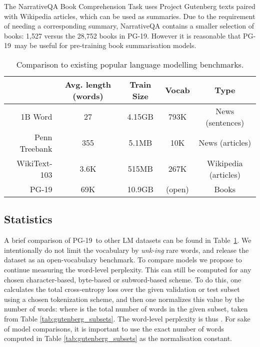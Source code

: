 \documentclass{article} \usepackage{iclr2020_conference,times}
\newcommand{\dataset}{PG-19}
\begin{document}
The NarrativeQA Book Comprehension Task \citep{kovcisky2018narrativeqa} uses Project Gutenberg texts paired with Wikipedia articles, which can be used as summaries. Due to the requirement of needing a corresponding summary, NarrativeQA contains a smaller selection of books: 1,527 versus the 28,752 books in \dataset. However it is reasonable that \dataset~may be useful for pre-training book summarisation models.
\begin{table}[]
    \footnotesize
    \centering
    \caption{Comparison to existing popular language modelling benchmarks.}
    \label{tab:compare_datasets}
    \begin{tabular}{rc c c c}
    \toprule
    & \textbf{Avg. length (words)} & \textbf{Train Size} & \textbf{Vocab} & \textbf{Type} \\
    \midrule
    1B Word &   27      & 4.15GB      & 793K & News (sentences) \\
    Penn Treebank           & 355       & 5.1MB   &  10K  & News (articles) \\
    WikiText-103            & 3.6K      & 515MB      & 267K & Wikipedia (articles) \\
    \midrule
    \dataset       & 69K       & 10.9GB     & (open) & Books \\
    \bottomrule
    \end{tabular}
\end{table}
\vspace{-1em}
\subsection{Statistics}
\label{sec:stats}
A brief comparison of \dataset~to other LM datasets can be found in Table~\ref{tab:compare_datasets}. 
We intentionally do not limit the vocabulary by \textit{unk-ing} rare words, and release the dataset as an open-vocabulary benchmark. To compare models we propose to continue measuring the word-level perplexity. This can still be computed for any chosen character-based, byte-based or subword-based scheme. To do this, one calculates the total cross-entropy loss  over the given validation or test subset using a chosen tokenization scheme, and then one normalizes this value by the number of words:  where  is the total number of words in the given subset, taken from Table \ref{tab:gutenberg_subsets}. The word-level perplexity is thus . For sake of model comparisons, it is important to use the exact number of words computed in Table \ref{tab:gutenberg_subsets} as the normalisation constant. 
\end{document}

